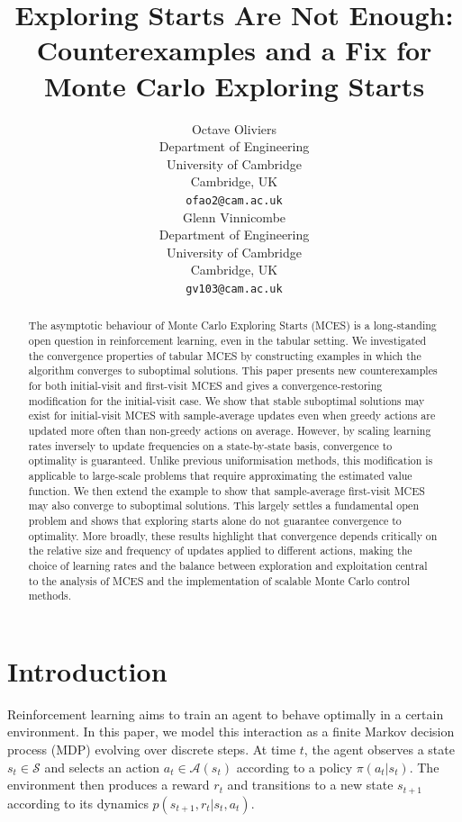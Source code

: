\documentclass{article}
\title{Exploring Starts Are Not Enough: \\ Counterexamples and a Fix for \\ Monte Carlo Exploring Starts}
\author{%
  Octave Oliviers \\
  Department of Engineering\\
  University of Cambridge\\
  Cambridge, UK \\
  \texttt{ofao2@cam.ac.uk} \\
   \And
  Glenn Vinnicombe \\
    Department of Engineering\\
  University of Cambridge\\
  Cambridge, UK \\
  \texttt{gv103@cam.ac.uk}
}
\begin{document}
\maketitle


\begin{abstract}
The asymptotic behaviour of Monte Carlo Exploring Starts (MCES) is a long-standing open question in reinforcement learning, even in the tabular setting.
We investigated the convergence properties of tabular MCES by constructing examples in which the algorithm converges to suboptimal solutions.
This paper presents new counterexamples for both initial-visit and first-visit MCES and gives a convergence-restoring modification for the initial-visit case.
We show that stable suboptimal solutions may exist for initial-visit MCES with sample-average updates even when greedy actions are updated more often than non-greedy actions on average.
However, by scaling learning rates inversely to update frequencies on a state-by-state basis, convergence to optimality is guaranteed.
Unlike previous uniformisation methods, this modification is applicable to large-scale problems that require approximating the estimated value function.
We then extend the example to show that sample-average first-visit MCES may also converge to suboptimal solutions.
This largely settles a fundamental open problem and shows that exploring starts alone do not guarantee convergence to optimality.
More broadly, these results highlight that convergence depends critically on the relative size and frequency of updates applied to different actions,
making the choice of learning rates and the balance between exploration and exploitation central to the analysis of MCES and the implementation of scalable Monte Carlo control methods.
\end{abstract}



\section{Introduction}

Reinforcement learning aims to train an agent to behave optimally in a certain environment.
In this paper, we model this interaction as a finite Markov decision process (MDP) evolving over discrete steps.
At time \(t\), the agent observes a state \(s_t \in \mathcal S\) and selects an action \(a_t \in \mathcal A(s_t)\) according to a policy \(\pi(a_t | s_t)\).
The environment then produces a reward \(r_t\) and transitions to a new state \(s_{t+1}\) according to its dynamics $p(s_{t+1}, r_t | s_t, a_t)$.
\end{document}
